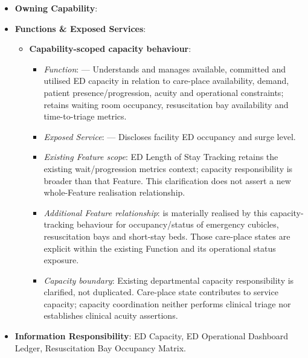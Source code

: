 \begin{itemize}

\item
\textbf{Owning Capability}: \texttt{}



\item
\textbf{Functions \& Exposed Services}:


\begin{itemize}

\item
\textbf{Capability-scoped capacity behaviour}:


\begin{itemize}

\item
\emph{Function}: \texttt{} — Understands and manages available, committed and utilised ED capacity in relation to care-place availability, demand, patient presence/\allowbreak{}progression, acuity and operational constraints; retains waiting room occupancy, resuscitation bay availability and time-to-triage metrics.



\item
\emph{Exposed Service}: \texttt{} — Discloses facility ED occupancy and surge level.



\item
\emph{Existing Feature scope}: ED Length of Stay Tracking retains the existing wait/\allowbreak{}progression metrics context; capacity responsibility is broader than that Feature. This clarification does not assert a new whole-Feature realisation relationship.



\item
\emph{Additional Feature relationship}: \texttt{} is materially realised by this capacity-tracking behaviour for occupancy/\allowbreak{}status of emergency cubicles, resuscitation bays and short-stay beds. Those care-place states are explicit within the existing Function and its operational status exposure.



\item
\emph{Capacity boundary}: Existing departmental capacity responsibility is clarified, not duplicated. Care-place state contributes to service capacity; capacity coordination neither performs clinical triage nor establishes clinical acuity assertions.



\end{itemize}


\end{itemize}


\item
\textbf{Information Responsibility}: ED Capacity, ED Operational Dashboard Ledger, Resuscitation Bay Occupancy Matrix.



\end{itemize}
\label{rad:hso:131}

